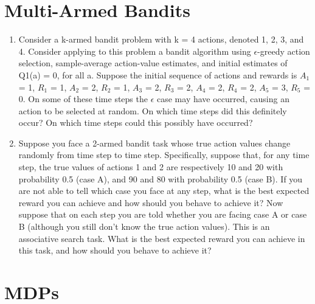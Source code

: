 \documentclass[11pt,onecolumn]{article}
\begin{document}
\section{Multi-Armed Bandits}
\begin{enumerate}
    \item Consider a k-armed bandit problem with k = 4 actions, denoted 1, 2, 3, and 4. Consider applying to this problem a bandit algorithm using $\epsilon$-greedy action selection, sample-average action-value estimates, and initial estimates of Q1(a) = 0, for all a. Suppose the initial sequence of actions and rewards is $A_1$ = 1, $R_1$ = 1, $A_2$ = 2, $R_2$ = 1, $A_3$ = 2, $R_3$ = 2, $A_4$ = 2, $R_4$ = 2, $A_5$ = 3, $R_5$ = 0. On some of these time steps the $\epsilon$ case may have occurred, causing an action to be selected at random. On which time steps did this definitely occur? On which time steps could this possibly have occurred? 
    
    \item Suppose you face a 2-armed bandit task whose true action values change randomly from time step to time step. Specifically, suppose that, for any time step, the true values of actions 1 and 2 are respectively 10 and 20 with probability 0.5 (case A), and 90 and 80 with probability 0.5 (case B). If you are not able to tell which case you face at any step, what is the best expected reward you can achieve and how should you behave to achieve it? Now suppose that on each step you are told whether you are facing case A or case B (although you still don’t know the true action values). This is an associative search task. What is the best expected reward you can achieve in this task, and how should you behave to achieve it?
\end{enumerate}



\section{MDPs}
\end{document}
